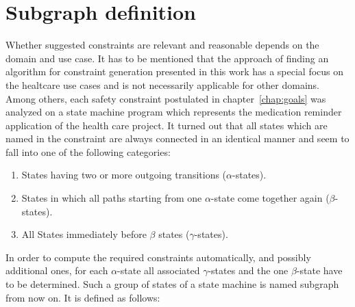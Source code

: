 \section{Subgraph definition}
\label{sec:subgraphdefinition}

Whether suggested constraints are relevant and reasonable
depends on the domain and use case. It has to be mentioned that the approach of finding an algorithm for constraint generation presented in this work has a special focus on the healtcare use cases and is not necessarily applicable for other domains.
Among others, each safety constraint postulated in chapter~\ref{chap:goals} was analyzed on a state machine program which represents the medication reminder application of the health care project. It turned out that all states which are named in the constraint are always connected in an identical manner and seem to fall into one of the following categories:

\begin{enumerate}
	\item States having two or more outgoing transitions ($\alpha$-states).
	\item States in which all paths starting from one $\alpha$-state come together again ($\beta$-states).
	\item All States immediately before $\beta$ states ($\gamma$-states).
\end{enumerate}

In order to compute the required constraints automatically, and possibly additional ones, for each $\alpha$-state all associated $\gamma$-states and the one $\beta$-state have to be determined. Such a group of states of a state machine is named subgraph from now on. It is defined as follows:

